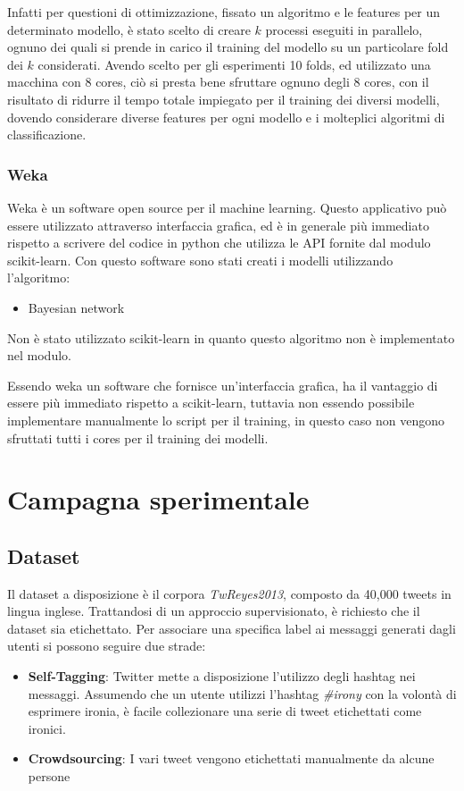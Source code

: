 \documentclass[oneside]{book}
\begin{document}
Infatti per questioni di ottimizzazione, fissato un algoritmo e le features per un determinato modello, è stato scelto di creare $k$ processi eseguiti in parallelo, ognuno dei quali si prende in carico il training del modello su un particolare fold dei $k$ considerati. Avendo scelto per gli esperimenti 10 folds, ed utilizzato una macchina con 8 cores, ciò si presta bene sfruttare ognuno degli 8 cores, con il risultato di ridurre il tempo totale impiegato per il training dei diversi modelli, dovendo considerare diverse features per ogni modello e i molteplici algoritmi di classificazione.

\subsection{Weka}

Weka\cite{weka} è un software open source per il machine learning. Questo applicativo può essere utilizzato attraverso interfaccia grafica, ed è in generale più immediato rispetto a scrivere del codice in python che utilizza le API fornite dal modulo scikit-learn. Con questo software sono stati creati i modelli utilizzando l'algoritmo:
\begin{itemize}
	\item Bayesian network
\end{itemize}
Non è stato utilizzato scikit-learn in quanto questo algoritmo non è implementato nel modulo.

Essendo weka un software che fornisce un'interfaccia grafica, ha il vantaggio di essere più immediato rispetto a scikit-learn, tuttavia non essendo possibile implementare manualmente lo script per il training, in questo caso non vengono sfruttati tutti i cores per il training dei modelli.

\chapter{Campagna sperimentale}

\section{Dataset}
Il dataset a disposizione è il corpora \emph{TwReyes2013}, composto da 40,000 tweets in lingua inglese. Trattandosi di un approccio supervisionato, è richiesto che il dataset sia etichettato. Per associare una specifica label ai messaggi generati dagli utenti si possono seguire due strade:

\begin{itemize}
	\item \textbf{Self-Tagging}:
	\label{chap:self-taggin}
	Twitter mette a disposizione l'utilizzo degli hashtag nei messaggi. Assumendo che un utente utilizzi l'hashtag \emph{\#irony} con la volontà di esprimere ironia, è facile collezionare una serie di tweet etichettati come ironici.
	
	\item \textbf{Crowdsourcing}:	
	I vari tweet vengono etichettati manualmente da alcune persone
\end{itemize}
\end{document}
